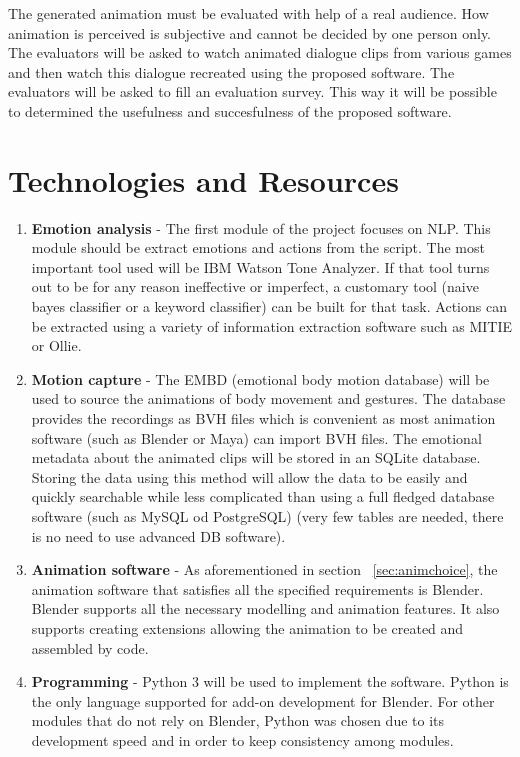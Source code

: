The generated animation must be evaluated with help of a real audience. How animation is perceived is subjective and cannot be decided by one person only. The evaluators will be asked to watch animated dialogue clips from various games and then watch this dialogue recreated using the proposed software. The evaluators will be asked to fill an evaluation survey. This way it will be possible to determined the usefulness and succesfulness of the proposed software.


\section{Technologies and Resources}

\begin{enumerate}
\item \textbf{Emotion analysis} - The first module of the project focuses on NLP. This module should be extract emotions and actions from the script. The most important tool used will be IBM Watson Tone Analyzer. If that tool turns out to be for any reason ineffective or imperfect, a customary tool (naive bayes classifier or a keyword classifier) can be built for that task. Actions can be extracted using a variety of information extraction software such as MITIE or Ollie.

\item \textbf{Motion capture} - The EMBD (emotional body motion database) will be used to source the animations of body movement and gestures. The database provides the recordings as BVH files which is convenient as most animation software (such as Blender or Maya) can import BVH files. The emotional metadata about the animated clips will be stored in an SQLite database. Storing the data using this method will allow the data to be easily and quickly searchable while less complicated than using a full fledged database software (such as MySQL od PostgreSQL) (very few tables are needed, there is no need to use advanced DB software).

\item \textbf{Animation software} - As aforementioned in section ~\ref{sec:animchoice}, the animation software that satisfies all the specified requirements is Blender. Blender supports all the necessary modelling and animation features. It also supports creating extensions allowing the animation to be created and assembled by code.

\item \textbf{Programming} - Python 3 will be used to implement the software. Python is the only language supported for add-on development for Blender. For other modules that do not rely on Blender, Python was chosen due to its development speed and in order to keep consistency among modules.

\end{enumerate}

